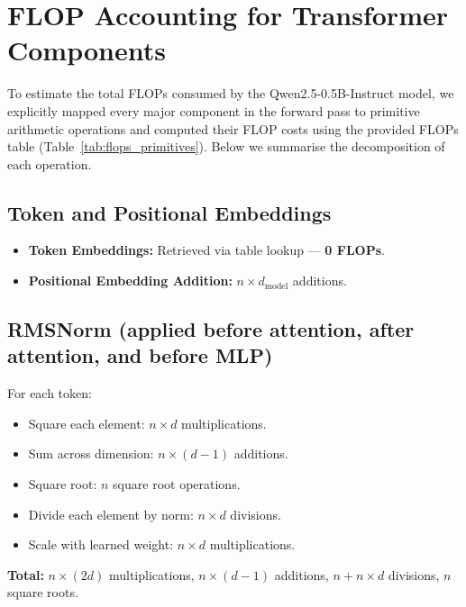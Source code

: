 \documentclass[a4paper,12pt]{article}
\begin{document}
  \section{FLOP Accounting for Transformer Components}

  To estimate the total FLOPs consumed by the Qwen2.5-0.5B-Instruct model, we explicitly mapped every major component in the forward pass to primitive arithmetic operations and computed their FLOP costs using the provided FLOPs table (Table~\ref{tab:flops_primitives}). Below we summarise the decomposition of each operation.
  
  \subsection*{Token and Positional Embeddings}
  \begin{itemize}
    \item \textbf{Token Embeddings:} Retrieved via table lookup — \textbf{0 FLOPs}.
    \item \textbf{Positional Embedding Addition:} $n \times d_{\text{model}}$ additions.
  \end{itemize}
  
  \subsection*{RMSNorm (applied before attention, after attention, and before MLP)}
  For each token:
  \begin{itemize}
    \item Square each element: $n \times d$ multiplications.
    \item Sum across dimension: $n \times (d - 1)$ additions.
    \item Square root: $n$ square root operations.
    \item Divide each element by norm: $n \times d$ divisions.
    \item Scale with learned weight: $n \times d$ multiplications.
  \end{itemize}
  \textbf{Total:} $n \times (2d)$ multiplications, $n \times (d - 1)$ additions, $n + n \times d$ divisions, $n$ square roots.
  
\end{document}
